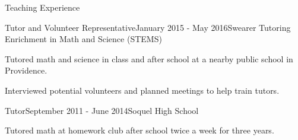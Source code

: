\documentclass{resume} %
\begin{document}
\begin{rSection}{Teaching Experience}
\begin{rSubsection}{Tutor and Volunteer Representative}{January 2015 - May 2016}{Swearer Tutoring Enrichment in Math and Science (STEMS)}{}
\item Tutored math and science in class and after school at a nearby public school in Providence.
\item Interviewed potential volunteers and planned meetings to help train tutors.
\end{rSubsection}

\begin{rSubsection}{Tutor}{September 2011 - June 2014}{Soquel High School}{}
\item Tutored math at homework club after school twice a week for three years.
\end{rSubsection}

\end{rSection}

\end{document}
